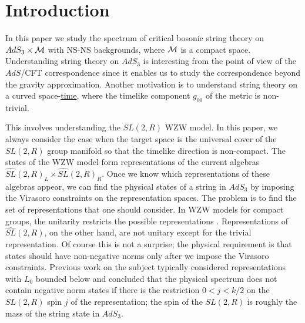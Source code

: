 \newpage


\section{Introduction}
\label{intro}

In this paper we study the spectrum of critical
bosonic  string theory on $AdS_3 \times {\cal M}$ with
NS-NS backgrounds, where ${\cal M}$ is a compact space.
Understanding string theory on $AdS_3$ is interesting from the
point of view of the $AdS$/CFT correspondence since it enables 
us to study the correspondence beyond the gravity approximation. 
Another motivation is to understand string theory on a curved
space-{\underline{time}}, where the timelike component $g_{00}$ 
of the metric is non-trivial. 


This involves understanding the $SL(2,R)$ WZW model. In this paper,
we always consider the case when the target space is 
the universal cover of the $SL(2,R)$ group manifold so that the
timelike direction is non-compact.  
The states of the WZW model form representations of
the  current algebras $\widehat{SL}(2,R)_L \times \widehat{SL}(2,R)_R$.
Once we know which representations of these algebras appear, 
we can find the physical states of a string in $AdS_3$ by imposing the 
Virasoro constraints on the representation spaces. The problem is to 
find the set of representations that one should consider. 
In WZW models for compact groups, the unitarity restricts the 
possible representations \cite{Gepner:1986wi}.
Representations of $\widehat{SL}(2,R)$, on the other hand, are not unitary
except for the trivial representation. Of course this is not a surprise; 
the physical requirement is that states should have non-negative norms
only after we impose the Virasoro constraints. 
Previous work on the subject 
\cite{Balog:1989jb,Petropoulos:1990fc,Mohammedi:1990dp,%
Bars:1991rb,Hwang:1991aq,%
Hwang:1992an,Hwang:1998tr,Evans:1998qu,Petropoulos:1999nc} typically 
considered representations with $L_0$ bounded
below and concluded that the physical spectrum does not contain
negative norm states if there is the restriction  $0<j<k/2$ on 
the $SL(2,R)$ spin $j$ of the representation; the spin 
of the $SL(2,R)$ is roughly the mass of the string state in $AdS_3$.

